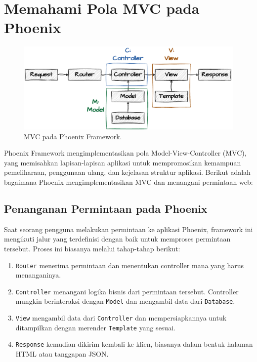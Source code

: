 \section{Memahami Pola MVC pada Phoenix}

\begin{figure}[h]
	\begin{center}
		\includegraphics[width=1\textwidth]{../assets/phoenix-mvc.pdf}
	\end{center}
	\caption{MVC pada Phoenix Framework.}
\end{figure}

Phoenix Framework mengimplementasikan pola Model-View-Controller (MVC), yang memisahkan lapisan-lapisan aplikasi untuk mempromosikan kemampuan pemeliharaan, penggunaan ulang, dan kejelasan struktur aplikasi. Berikut adalah bagaimana Phoenix mengimplementasikan MVC dan menangani permintaan web:

\subsection{Penanganan Permintaan pada Phoenix}
Saat seorang pengguna melakukan permintaan ke aplikasi Phoenix, framework ini mengikuti jalur yang terdefinisi dengan baik untuk memproses permintaan tersebut. Proses ini biasanya melalui tahap-tahap berikut:
\begin{enumerate}
	\item \texttt{Router} menerima permintaan dan menentukan controller mana yang harus menanganinya.
	\item \texttt{Controller} menangani logika bisnis dari permintaan tersebut. Controller mungkin berinteraksi dengan \texttt{Model} dan mengambil data dari \texttt{Database}.
	\item \texttt{View} mengambil data dari \texttt{Controller} dan mempersiapkannya untuk ditampilkan dengan merender \texttt{Template} yang sesuai.
	\item \texttt{Response} kemudian dikirim kembali ke klien, biasanya dalam bentuk halaman HTML atau tanggapan JSON.
\end{enumerate}

